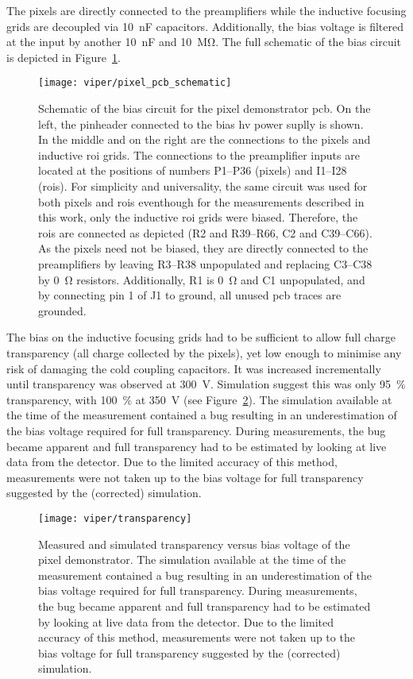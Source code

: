 The pixels are directly connected to the preamplifiers while the inductive focusing grids are decoupled via \SI{10}{\nano\farad} capacitors.
Additionally, the bias voltage is filtered at the input by another \SI{10}{\nano\farad} and \SI{10}{\mega\ohm}.
The full schematic of the bias circuit is depicted in Figure~\ref{fig:viper_pcb_schematic}.

\begin{figure}[htb]
	\centering
	\texttt{[image: viper/pixel\_pcb\_schematic]}
	\caption{Schematic of the bias circuit for the \AC{} pixel demonstrator \gls{pcb}.
	On the left, the pinheader connected to the bias \gls{hv} power suplly is shown. In the middle and on the right are the connections to the pixels and inductive \gls{roi} grids.
	The connections to the preamplifier inputs are located at the positions of numbers P1--P36 (pixels) and I1--I28 (\glspl{roi}).
	For simplicity and universality, the same circuit was used for both pixels and \glspl{roi} eventhough for the measurements described in this work, only the inductive \gls{roi} grids were biased.
	Therefore, the \glspl{roi} are connected as depicted (R2 and R39--R66, C2 and C39--C66).
	As the pixels need not be biased, they are directly connected to the preamplifiers by leaving R3--R38 unpopulated and replacing C3--C38 by \SI{0}{\ohm} resistors.
	Additionally, R1 is \SI{0}{\ohm} and C1 unpopulated, and by connecting pin 1 of J1 to ground, all unused \gls{pcb} traces are grounded.}
	\label{fig:viper_pcb_schematic}
\end{figure}

The bias on the inductive focusing grids had to be sufficient to allow full charge transparency (all charge collected by the pixels), yet low enough to minimise any risk of damaging the cold coupling capacitors.
It was increased incrementally until transparency was observed at \SI{300}{\volt}. 
Simulation suggest this was only \SI{95}{\percent} transparency, with \SI{100}{\percent} at \SI{350}{\volt} (see Figure~\ref{fig:viper_transparency}).
The simulation available at the time of the measurement contained a bug resulting in an underestimation of the bias voltage required for full transparency.
During measurements, the bug became apparent and full transparency had to be estimated by looking at live data from the detector.
Due to the limited accuracy of this method, measurements were not taken up to the bias voltage for full transparency suggested by the (corrected) simulation.~\cite{francypants}

\begin{figure}[htb]
	\centering
	\texttt{[image: viper/transparency]}
	\caption{Measured and simulated transparency versus bias voltage of the \AC{} pixel demonstrator.
	The simulation available at the time of the measurement contained a bug resulting in an underestimation of the bias voltage required for full transparency.
	During measurements, the bug became apparent and full transparency had to be estimated by looking at live data from the detector.
	Due to the limited accuracy of this method, measurements were not taken up to the bias voltage for full transparency suggested by the (corrected) simulation.~\cite{francypants}}
	\label{fig:viper_transparency}
\end{figure}


